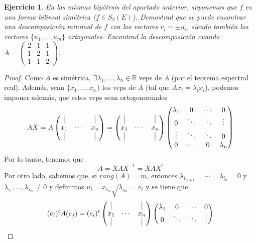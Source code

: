 \documentclass[12pt]{article}
\newcommand{\real}{\mathbb{R}}
\newcommand\inv[1]{#1^{-1}}
\theoremstyle{break}
\newtheorem{ej}{Ejercicio}
\newtheorem*{proof}{Demostración}
\begin{document}
\begin{ej}
	En las mismas hipótesis del apartado anterior, suponemos que $f$ es una forma bilineal
	simétrica ($f \in S_2(E)$). Demostrad que se puede encontrar una descomposición minimal
	de $f$ con los vectores $v_i = \pm u_i$, siendo también los vectores $\{u_1,\dots,u_m\}$ ortogonales. Encontrad la descomposición cuando $A = \begin{pmatrix}
		2 & 1 & 1 \\ 1 & 2 & 1 \\ 1 & 1 & 2
	\end{pmatrix}$.
\end{ej}
\begin{proof}
	Como $A$ es simétrica, $\exists \lambda_1,\dots,\lambda_n \in \real$ veps de $A$ (por el
	teorema espectral real). Además, sean $\{x_1,\dots,x_n\}$ los veps de $A$ (tal que 
	$Ax_i = \lambda_i x_i$), podemos imponer además, que estos veps sean ortogonormales
	\[
		AX = A\begin{pmatrix}
			\vline & & \vline \\ x_1 & \cdots & x_n \\ \vline & & \vline
		\end{pmatrix}
		= \begin{pmatrix}
			\vline & & \vline \\ x_1 & \cdots & x_n \\ \vline & & \vline
		\end{pmatrix} \begin{pmatrix}
			\lambda_1 & 0 & \cdots & 0 \\ 0 & \ddots & \ddots & \vdots \\
			\vdots & \ddots & \ddots & 0 \\ 0 & \cdots & 0 & \lambda_n
		\end{pmatrix}
	\]
	Por lo tanto, tenemos que
	\[
		A = X\Lambda \inv{X} = X \Lambda X^t
	\]
	Por otro lado, sabemos que, si $rang(A) = m$, entonces $\lambda_{i_{m+1}} = \cdots
	= \lambda_{i_n} = 0$ y $\lambda_{i_1}, \dots, \lambda_{i_m} \neq 0$ y definimos
	$u_i = x_{i_m} \sqrt{\lambda_{i_m}} = v_i$
	y se tiene que
	\begin{gather*}
		(e_i)^tA(e_j)=(e_i)^t \begin{pmatrix}
		\vline & & \vline \\ x_1 & \cdots & x_n \\ \vline & & \vline
		\end{pmatrix} \begin{pmatrix}
		\lambda_1 & 0 & \cdots & 0 \\ 0 & \ddots & \ddots & \vdots \\

\end{pmatrix}
\end{gather*}
\end{proof}
\end{document}
